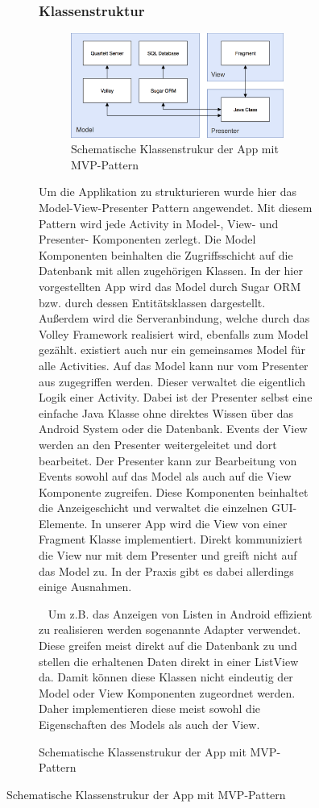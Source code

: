 \documentclass{scrartcl}
\begin{document}
\begin{figure}[!ht]
\begin{figure}[!ht]
\subsubsection{Klassenstruktur}

\begin{figure}[!ht]
  \centering
  \includegraphics[width=\textwidth]{img/class_structure.png}
  \caption{Schematische Klassenstrukur der App mit MVP-Pattern}
\end{figure}

Um die Applikation zu strukturieren wurde hier das Model-View-Presenter Pattern
angewendet. Mit diesem Pattern wird jede Activity in Model-, View- und
Presenter- Komponenten zerlegt. Die Model Komponenten beinhalten die
Zugriffsschicht auf die Datenbank mit allen zugehörigen Klassen. In der hier
vorgestellten App wird das Model durch Sugar ORM bzw. durch dessen
Entitätsklassen dargestellt. Außerdem wird die Serveranbindung, welche durch das
Volley Framework realisiert wird, ebenfalls zum Model gezählt. existiert auch
nur ein gemeinsames Model für alle Activities. Auf das Model kann nur vom
Presenter aus zugegriffen werden. Dieser verwaltet die
eigentlich Logik einer Activity. Dabei ist der Presenter selbst eine einfache
Java Klasse ohne direktes Wissen über das Android System oder die Datenbank.
Events der View werden an den Presenter weitergeleitet und dort bearbeitet. Der
Presenter kann zur Bearbeitung von Events sowohl auf das Model als auch auf die
View Komponente zugreifen. Diese Komponenten beinhaltet die Anzeigeschicht und
verwaltet die einzelnen GUI-Elemente. In unserer App wird die View von einer
Fragment Klasse implementiert. Direkt kommuniziert die View nur mit dem
Presenter und greift nicht auf das Model zu. In der Praxis gibt es dabei
allerdings einige Ausnahmen.

\ \newline
Um z.B. das Anzeigen von Listen in Android
effizient zu realisieren werden sogenannte Adapter verwendet. Diese greifen
meist direkt auf die Datenbank zu und stellen die erhaltenen Daten direkt in
einer ListView da. Damit können diese Klassen nicht eindeutig der Model oder
View Komponenten zugeordnet werden. Daher implementieren diese meist sowohl die
Eigenschaften des Models als auch der View.


\end{figure}
\end{figure}
\end{document}
